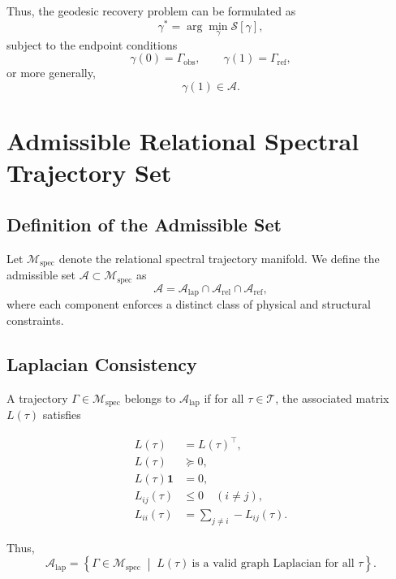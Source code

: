 \documentclass[11pt,a4paper]{article}
\theoremstyle{definition}
\theoremstyle{remark}
\begin{document}
Thus, the geodesic recovery problem can be formulated as
\begin{equation}
\gamma^{*}
=
\arg\min_{\gamma}
\mathcal{S}[\gamma],
\end{equation}
subject to the endpoint conditions
\begin{equation}
\gamma(0)=\Gamma_{\mathrm{obs}},
\qquad
\gamma(1)=\Gamma_{\mathrm{ref}},
\end{equation}
or more generally,
\begin{equation}
\gamma(1)\in\mathcal{A}.
\end{equation}

\section{Admissible Relational Spectral Trajectory Set}

\subsection{Definition of the Admissible Set}

Let $\mathcal{M}_{\mathrm{spec}}$ denote the relational spectral trajectory manifold.
We define the admissible set $\mathcal{A} \subset \mathcal{M}_{\mathrm{spec}}$ as
\begin{equation}
\mathcal{A}
=
\mathcal{A}_{\mathrm{lap}}
\cap
\mathcal{A}_{\mathrm{rel}}
\cap
\mathcal{A}_{\mathrm{ref}},
\end{equation}
where each component enforces a distinct class of physical and structural constraints.

\subsection{Laplacian Consistency}

A trajectory $\Gamma \in \mathcal{M}_{\mathrm{spec}}$ belongs to $\mathcal{A}_{\mathrm{lap}}$
if for all $\tau \in \mathcal{T}$, the associated matrix $L(\tau)$ satisfies

\begin{align}
L(\tau) &= L(\tau)^\top, \\
L(\tau) &\succeq 0, \\
L(\tau)\mathbf{1} &= 0, \\
L_{ij}(\tau) &\le 0 \quad (i \neq j), \\
L_{ii}(\tau) &= \sum_{j\neq i} -L_{ij}(\tau).
\end{align}

Thus,
\begin{equation}
\mathcal{A}_{\mathrm{lap}}
=
\left\{
\Gamma \in \mathcal{M}_{\mathrm{spec}}
\;\middle|\;
L(\tau)\ \text{is a valid graph Laplacian for all }\tau
\right\}.
\end{equation}
\end{document}
